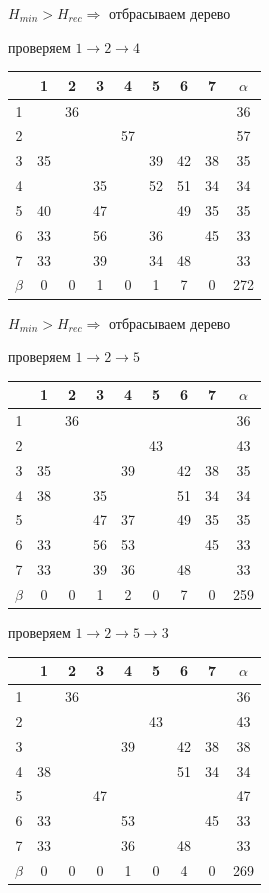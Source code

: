 \documentclass[russian]{article}
\begin{document}
$H_{min} > H_{rec} \Rightarrow $ отбрасываем дерево

проверяем 
$1 \to 2 \to 4$

\begin{tabular}{|c|c|c|c|c|c|c|c|c|}\hline
& 1& 2& 3& 4& 5& 6& 7& $\alpha$\\\hline
1& & 36& & & & & & 36\\\hline
2& & & & 57& & & & 57\\\hline
3& 35& & & & 39& 42& 38& 35\\\hline
4& & & 35& & 52& 51& 34& 34\\\hline
5& 40& & 47& & & 49& 35& 35\\\hline
6& 33& & 56& & 36& & 45& 33\\\hline
7& 33& & 39& & 34& 48& & 33\\\hline
$\beta$& 0& 0& 1& 0& 1& 7& 0& 272\\\hline
\end{tabular}

$H_{min} > H_{rec} \Rightarrow $ отбрасываем дерево

проверяем 
$1 \to 2 \to 5$

\begin{tabular}{|c|c|c|c|c|c|c|c|c|}\hline
& 1& 2& 3& 4& 5& 6& 7& $\alpha$\\\hline
1& & 36& & & & & & 36\\\hline
2& & & & & 43& & & 43\\\hline
3& 35& & & 39& & 42& 38& 35\\\hline
4& 38& & 35& & & 51& 34& 34\\\hline
5& & & 47& 37& & 49& 35& 35\\\hline
6& 33& & 56& 53& & & 45& 33\\\hline
7& 33& & 39& 36& & 48& & 33\\\hline
$\beta$& 0& 0& 1& 2& 0& 7& 0& 259\\\hline
\end{tabular}

проверяем 
$1 \to 2 \to 5 \to 3$

\begin{tabular}{|c|c|c|c|c|c|c|c|c|}\hline
& 1& 2& 3& 4& 5& 6& 7& $\alpha$\\\hline
1& & 36& & & & & & 36\\\hline
2& & & & & 43& & & 43\\\hline
3& & & & 39& & 42& 38& 38\\\hline
4& 38& & & & & 51& 34& 34\\\hline
5& & & 47& & & & & 47\\\hline
6& 33& & & 53& & & 45& 33\\\hline
7& 33& & & 36& & 48& & 33\\\hline
$\beta$& 0& 0& 0& 1& 0& 4& 0& 269\\\hline
\end{tabular}
\end{document}
